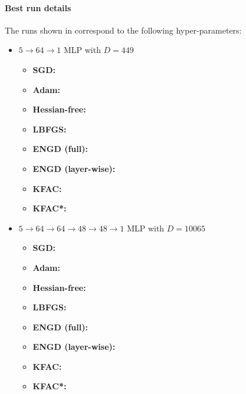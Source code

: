 \paragraph{Best run details}
The runs shown in  correspond to the following hyper-parameters:
\begin{itemize}
\item $5\to 64\to 1$ MLP with $D=449$
  \begin{itemize}
    \def\pathToRuns{../kfac_pinns_exp/exp10_reproduce_poisson5d/tex}
  \item \textbf{SGD:} 
  \item \textbf{Adam:} 
  \item \textbf{Hessian-free:} 
  \item \textbf{LBFGS:} 
  \item \textbf{ENGD (full):} 
  \item \textbf{ENGD (layer-wise):} 
  \item \textbf{KFAC:} 
  \item \textbf{KFAC*:} 
  \end{itemize}

\item $5 \to 64 \to 64 \to 48 \to 48 \to 1$ MLP with $D=\num{10065}$
  \begin{itemize}
    \def\pathToRuns{../kfac_pinns_exp/exp16_poisson5d_deepwide/tex}
  \item \textbf{SGD:} 
  \item \textbf{Adam:} 
  \item \textbf{Hessian-free:} 
  \item \textbf{LBFGS:} 
  \item \textbf{ENGD (full):} 
  \item \textbf{ENGD (layer-wise):} 
  \item \textbf{KFAC:} 
  \item \textbf{KFAC*:} 
  \end{itemize}


\end{itemize}
